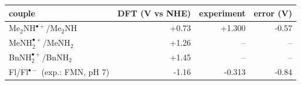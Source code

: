 \begin{tabular}{lrrr}
\toprule
couple & DFT (V vs NHE) & experiment & error (V) \\
\midrule
Me$_2$NH$^{\bullet+}$/Me$_2$NH & +0.73 & +1.300 & -0.57 \\
MeNH$_2^{\bullet+}$/MeNH$_2$ & +1.26 & -- & -- \\
BnNH$_2^{\bullet+}$/BnNH$_2$ & +1.45 & -- & -- \\
Fl/Fl$^{\bullet-}$ (exp.: FMN, pH 7) & -1.16 & -0.313 & -0.84 \\
\bottomrule
\end{tabular}
